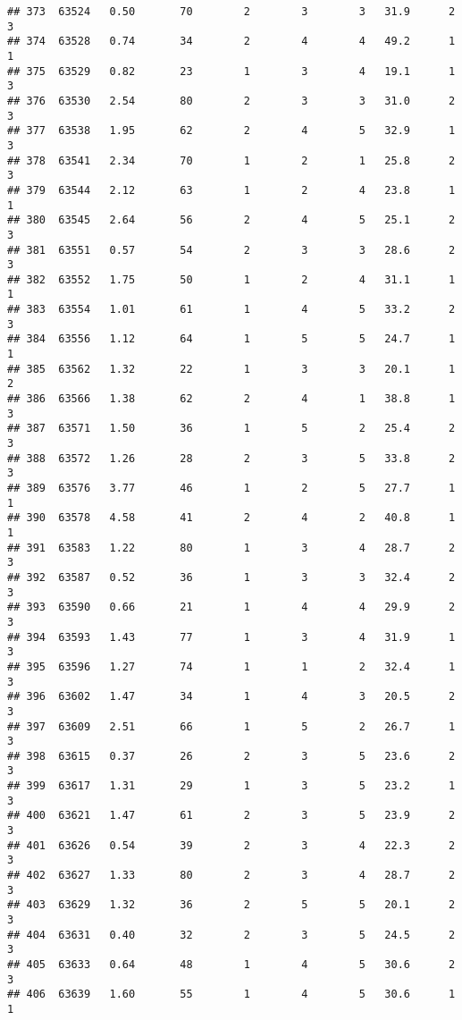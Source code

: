 \documentclass[
]{article}
\begin{document}
\begin{verbatim}
## 373  63524   0.50       70        2        3        3   31.9      2      3
## 374  63528   0.74       34        2        4        4   49.2      1      1
## 375  63529   0.82       23        1        3        4   19.1      1      3
## 376  63530   2.54       80        2        3        3   31.0      2      3
## 377  63538   1.95       62        2        4        5   32.9      1      3
## 378  63541   2.34       70        1        2        1   25.8      2      3
## 379  63544   2.12       63        1        2        4   23.8      1      1
## 380  63545   2.64       56        2        4        5   25.1      2      3
## 381  63551   0.57       54        2        3        3   28.6      2      3
## 382  63552   1.75       50        1        2        4   31.1      1      1
## 383  63554   1.01       61        1        4        5   33.2      2      3
## 384  63556   1.12       64        1        5        5   24.7      1      1
## 385  63562   1.32       22        1        3        3   20.1      1      2
## 386  63566   1.38       62        2        4        1   38.8      1      3
## 387  63571   1.50       36        1        5        2   25.4      2      3
## 388  63572   1.26       28        2        3        5   33.8      2      3
## 389  63576   3.77       46        1        2        5   27.7      1      1
## 390  63578   4.58       41        2        4        2   40.8      1      1
## 391  63583   1.22       80        1        3        4   28.7      2      3
## 392  63587   0.52       36        1        3        3   32.4      2      3
## 393  63590   0.66       21        1        4        4   29.9      2      3
## 394  63593   1.43       77        1        3        4   31.9      1      3
## 395  63596   1.27       74        1        1        2   32.4      1      3
## 396  63602   1.47       34        1        4        3   20.5      2      3
## 397  63609   2.51       66        1        5        2   26.7      1      3
## 398  63615   0.37       26        2        3        5   23.6      2      3
## 399  63617   1.31       29        1        3        5   23.2      1      3
## 400  63621   1.47       61        2        3        5   23.9      2      3
## 401  63626   0.54       39        2        3        4   22.3      2      3
## 402  63627   1.33       80        2        3        4   28.7      2      3
## 403  63629   1.32       36        2        5        5   20.1      2      3
## 404  63631   0.40       32        2        3        5   24.5      2      3
## 405  63633   0.64       48        1        4        5   30.6      2      3
## 406  63639   1.60       55        1        4        5   30.6      1      1

\end{verbatim}
\end{document}
